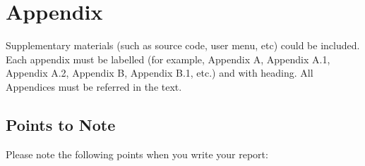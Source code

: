 
\section{Appendix}
	Supplementary materials (such as source code, user menu, etc) could be included. Each appendix must be labelled (for example, Appendix A, Appendix A.1, Appendix A.2,  Appendix B, Appendix B.1, etc.) and with heading.  All Appendices must be referred in the text.  

\subsection{Points to Note}
Please note the following points when you write your report:
